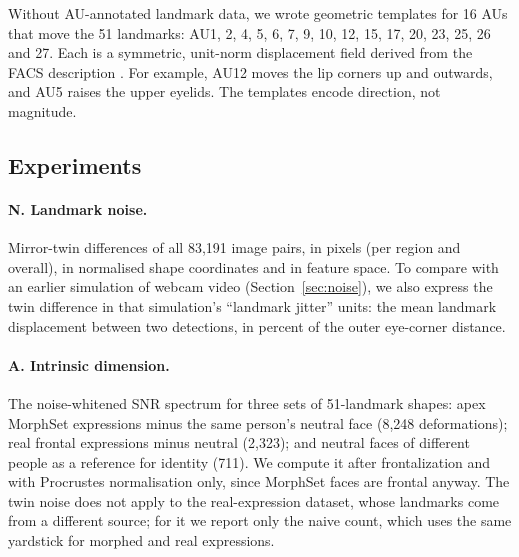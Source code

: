 \documentclass[11pt,a4paper]{article}
\begin{document}
Without AU-annotated landmark data, we wrote geometric templates for 16 AUs that move the 51
landmarks: AU1, 2, 4, 5, 6, 7, 9, 10, 12, 15, 17, 20, 23, 25, 26 and 27. Each is a symmetric,
unit-norm displacement field derived from the FACS description \citep{ekman2002facs}. For example,
AU12 moves the lip corners up and outwards, and AU5 raises the upper eyelids. The templates encode
direction, not magnitude.

\subsection{Experiments}\label{sec:experiments}

\paragraph{N. Landmark noise.} Mirror-twin differences of all 83,191 image pairs, in pixels (per
region and overall), in normalised shape coordinates and in feature space. To compare with an
earlier simulation of webcam video (Section~\ref{sec:noise}), we also express the twin difference
in that simulation's ``landmark jitter'' units: the mean landmark displacement between two
detections, in percent of the outer eye-corner distance.

\paragraph{A. Intrinsic dimension.} The noise-whitened SNR spectrum for three sets of 51-landmark
shapes: apex MorphSet expressions minus the same person's neutral face (8,248 deformations); real
frontal expressions minus neutral (2,323); and neutral faces of different people as a reference
for identity (711). We compute it after frontalization and with Procrustes normalisation only,
since MorphSet faces are frontal anyway. The twin noise does not apply to the real-expression
dataset, whose landmarks come from a different source; for it we report only the naive count,
which uses the same yardstick for morphed and real expressions.
\end{document}
